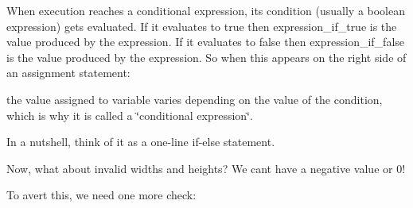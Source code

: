 \begin{DoxyCode}{0}
\end{DoxyCode}


When execution reaches a conditional expression, its {\ttfamily condition} (usually a boolean expression) gets evaluated. If it evaluates to {\ttfamily true} then {\ttfamily expression\+\_\+if\+\_\+true} is the value produced by the expression. If it evaluates to {\ttfamily false} then {\ttfamily expression\+\_\+if\+\_\+false} is the value produced by the expression. So when this appears on the right side of an assignment statement\+:


\begin{DoxyCode}{0}
\end{DoxyCode}


the value assigned to {\ttfamily variable} varies depending on the value of the {\ttfamily condition}, which is why it is called a \char`\"{}conditional expression\char`\"{}.

In a nutshell, think of it as a one-\/line if-\/else statement.

Now, what about invalid widths and heights? We can\textquotesingle{}t have a negative value or 0!

To avert this, we need one more check\+:


\begin{DoxyCode}{0}
\DoxyCodeLine{\textcolor{preprocessor}{\#include <tsgl.h>}}
\DoxyCodeLine{}
\DoxyCodeLine{  \}}
\DoxyCodeLine{\}}
\end{DoxyCode}


